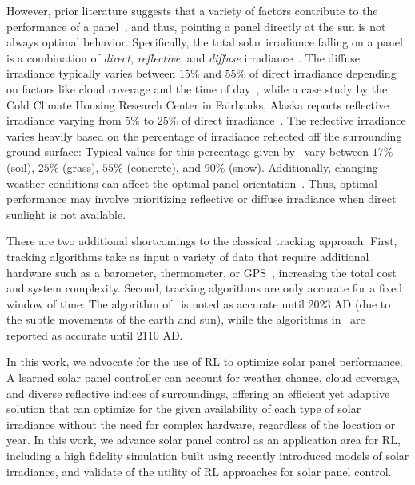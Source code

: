 \documentclass{article}
\begin{document}
However, prior literature suggests that a variety of factors contribute to the performance of a panel~\cite{King2001}, and thus, pointing a panel directly at the sun is not always optimal behavior. Specifically, the total solar irradiance falling on a panel is a combination of {\it direct}, {\it reflective}, and {\it diffuse} irradiance~\cite{Benghanem2011}. The diffuse irradiance typically varies between $15\%$ and $55\%$ of direct irradiance depending on factors like cloud coverage and the time of day~\cite{peterson1981ratio}, while a case study by the Cold Climate Housing Research Center in Fairbanks, Alaska reports reflective irradiance varying from $5\%$ to $25\%$ of direct irradiance~\cite{colgan2010}. The reflective irradiance varies heavily based on the percentage of irradiance reflected off the surrounding ground surface: Typical values for this percentage given by~\citet{mcevoy2003practical} vary between $17\%$ (soil), $25\%$ (grass), $55\%$ (concrete), and $90\%$ (snow). Additionally, changing weather conditions can affect the optimal panel orientation~\cite{Kelly2009}. Thus, optimal performance may involve prioritizing reflective or diffuse irradiance when direct sunlight is not available.

There are two additional shortcomings to the classical tracking approach. First, tracking algorithms take as input a variety of data that require additional hardware such as a barometer, thermometer, or GPS~\cite{Grena2012}, increasing the total cost and system complexity. Second, tracking algorithms are only accurate for a fixed window of time: The algorithm of~\citet{Grena2008} is noted as accurate until 2023 AD (due to the subtle movements of the earth and sun), while the algorithms in~\citet{Grena2012} are reported as accurate until 2110 AD.

In this work, we advocate for the use of RL to optimize solar panel performance. A learned solar panel controller can account for weather change, cloud coverage, and diverse reflective indices of surroundings, offering an efficient yet adaptive solution that can optimize for the given availability of each type of solar irradiance without the need for complex hardware, regardless of the location or year. In this work, we advance solar panel control as an application area for RL, including a high fidelity simulation built using recently introduced models of solar irradiance, and validate of the utility of RL approaches for solar panel control.
\end{document}
